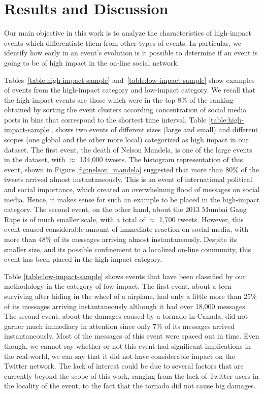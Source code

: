 \section*{Results and Discussion}
Our main objective in this work is to analyze the
  characteristics of high-impact events which differentiate them from
  other types of events. In particular, we identify how early in an
  event's evolution is it possible to determine if an event is going
  to be of high impact in the on-line social network.

Tables~\ref{table:high-impact-sample}
and~\ref{table:low-impact-sample} show examples of events from the high-impact category and 
low-impact category. We recall that the high-impact
events are those which were in the top 8\% of the ranking obtained by
sorting the event clusters according concentration of social media
posts in bins that correspond to the shortest time interval.  Table
\ref{table:high-impact-sample}, shows two events of different sizes
(large and small) and different scopes (one global and the other more local)
categorized as high impact in our dataset. The first event, the death
of Nelson Mandela, is one of the large events in the dataset, with
$\approx$ 134,000 tweets. The histogram representation of this event,
shown in Figure \ref{fig:nelson_mandela} suggested that more than $80\%$ of
the tweets arrived almost instantaneously. This is an event of
international political and social importance, which created an
overwhelming flood of messages on social media.  Hence, it makes sense
for such an example to be placed in the high-impact category.  The
second event, on the other hand, about the 2013 Mumbai Gang Rape is of
much smaller scale, with a total of $\approx$ 1,700 tweets.  However,
this event caused considerable amount of immediate reaction on social
media, with more than $48\%$ of its messages arriving almost
instantaneously.  Despite its smaller size, and its possible
confinement to a localized on-line community, this event has been
placed in the high-impact category.

Table \ref{table:low-impact-sample} shows events that have been
classified by our methodology in the category of low impact.  The
first event, about a teen surviving after hiding in the wheel of a
airplane, had only a little more than $25\%$ of its messages arriving
instantaneously although it had over 18,000 messages.  The second
event, about the damages caused by a tornado in Canada, did not garner
much immediacy in attention since only $7\%$ of its messages arrived
instantaneously. Most of the messages of this event were spaced out in
time. Even though, we cannot say whether or not this event had
significant implications in the real-world, we can say that it did not 
have considerable impact on the Twitter network. The lack of interest
could be due to several factors that are currently beyond the scope of
this work, ranging from the lack of Twitter users in the locality of
the event, to the fact that the tornado did not cause big damages. 

